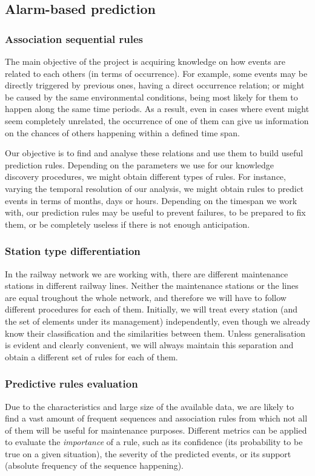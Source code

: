 \documentclass[a4paper,10pt]{report}
\begin{document}
\subsection{Alarm-based prediction}\label{sec:alarm-based-prediction}
\subsubsection{Association sequential rules}
The main objective of the project is acquiring knowledge on how events are related to each others (in terms of occurrence). For example, some events may be directly triggered by previous ones, having a direct occurrence relation; or might be caused by the same environmental conditions, being most likely for them to happen along the same time periods. As a result, even in cases where event might seem completely unrelated, the occurrence of one of them can give us information on the chances of others happening within a defined time span.

Our objective is to find and analyse these relations and use them to build useful prediction rules. Depending on the parameters we use for our knowledge discovery procedures, we might obtain different types of rules. For instance, varying the temporal resolution of our analysis, we might obtain rules to predict events in terms of months, days or hours. Depending on the timespan we work with, our prediction rules may be useful to prevent failures, to be prepared to fix them, or be completely useless if there is not enough anticipation.
\subsubsection{Station type differentiation}
In the railway network we are working with, there are different maintenance stations in different railway lines. Neither the maintenance stations or the lines are equal troughout the whole network, and therefore we will have to follow different procedures for each of them. Initially, we will treat every station (and the set of elements under its management) independently, even though we already know their classification and the similarities between them. Unless generalisation is evident and clearly convenient, we will always maintain this separation and obtain a different set of rules for each of them.
\subsubsection{Predictive rules evaluation}
Due to the characteristics and large size of the available data, we are likely to find a vast amount of frequent sequences and association rules from which not all of them will be useful for maintenance purposes. Different metrics can be applied to evaluate the \emph{importance} of a rule, such as its confidence (its probability to be true on a given situation), the severity of the predicted events, or its support (absolute frequency of the sequence happening).
\end{document}
